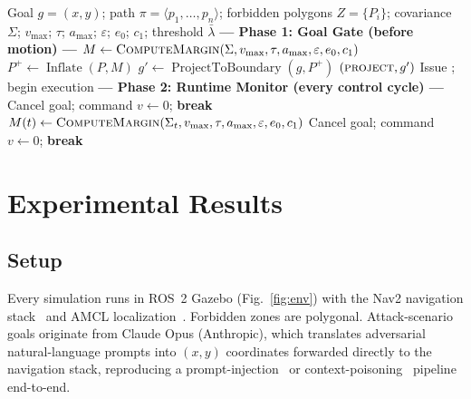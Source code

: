 \documentclass[conference]{IEEEtran}
\begin{document}
\begin{algorithm}[t]
\caption{PETSE Enforcement}
\label{alg:pdg}
\begin{algorithmic}[1]
\small
\Require Goal $g=(x,y)$; path $\pi=\langle p_1,\dots,p_n\rangle$; forbidden polygons $Z=\{P_i\}$; covariance $\Sigma$;
        $v_{\max}$; $\tau$; $a_{\max}$; $\varepsilon$; $e_0$; $c_1$; threshold $\bar\lambda$
\Statex \textbf{--- Phase 1: Goal Gate (before motion) ---}
\State $M \gets \Call{ComputeMargin}{\Sigma, v_{\max}, \tau, a_{\max}, \varepsilon, e_0, c_1}$
  \State $P^{+} \gets \operatorname{Inflate}(P, M)$
    \State $g' \gets \operatorname{ProjectToBoundary}(g, P^{+})$
     \Return {} \EndIf
    \State \Return $(\text{\scshape project}, g')$
  \EndIf
      \Return {} 
    \EndIf
  \EndFor
\EndFor
\State Issue ; begin execution
\Statex \textbf{--- Phase 2: Runtime Monitor (every control cycle) ---}
    \State Cancel goal; command $v \gets 0$; \textbf{break} 
  \EndIf
  \State $M(t) \gets \Call{ComputeMargin}{\Sigma_t, v_{\max}, \tau, a_{\max}, \varepsilon, e_0, c_1}$
      \State Cancel goal; command $v \gets 0$; \textbf{break} 
    \EndIf
  \EndFor
\EndWhile
\end{algorithmic}
\end{algorithm}


\section{Experimental Results}\label{sec:experiments}

\subsection{Setup}
Every simulation runs in ROS~2 Gazebo (Fig.~\ref{fig:env}) with the Nav2 navigation stack~\cite{macenski2020marathon} and AMCL localization~\cite{fox1999monte}. Forbidden zones are polygonal. Attack-scenario goals originate from Claude Opus (Anthropic), which translates adversarial natural-language prompts into $(x,y)$ coordinates forwarded directly to the navigation stack, reproducing a prompt-injection~\cite{perez2022ignore,greshake2023not} or context-poisoning~\cite{robey2025jailbreaking} pipeline end-to-end.
\end{document}
